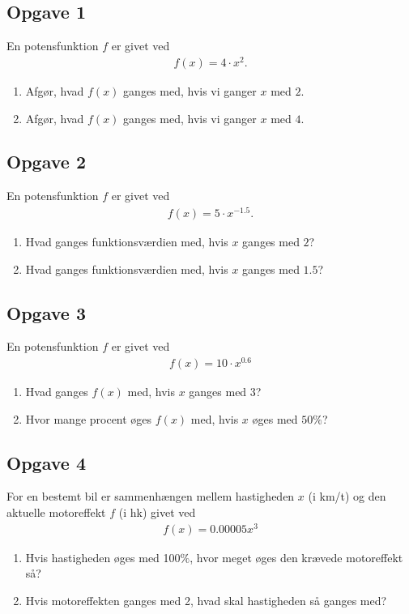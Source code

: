 \subsection*{Opgave 1}
En potensfunktion $f$ er givet ved
\begin{align*}
	f(x) = 4\cdot x^2.
\end{align*}
\begin{enumerate}[label=\roman*)]
	\item Afgør, hvad $f(x)$ ganges med, hvis vi ganger $x$ med $2$.
	\item Afgør, hvad $f(x)$ ganges med, hvis vi ganger $x$ med $4$.
\end{enumerate}

\subsection*{Opgave 2}
En potensfunktion $f$ er givet ved
\begin{align*}
	f(x) = 5\cdot x^{-1.5}.
\end{align*}
\begin{enumerate}[label=\roman*)]
	\item Hvad ganges funktionsværdien med, hvis $x$ ganges med $2$?
	\item Hvad ganges funktionsværdien med, hvis $x$ ganges med $1.5$?
\end{enumerate}

\subsection*{Opgave 3}
En potensfunktion $f$ er givet ved
\begin{align*}
	f(x) = 10\cdot x^{0.6}
\end{align*}
\begin{enumerate}[label=\roman*)]
	\item Hvad ganges $f(x)$ med, hvis $x$ ganges med $3$?
	\item Hvor mange procent øges $f(x)$ med, hvis $x$ øges med $50\%$?
\end{enumerate}

\subsection*{Opgave 4}
For en bestemt bil er sammenhængen mellem hastigheden $x$ (i km/t) og den aktuelle motoreffekt $f$ (i hk) givet ved
\begin{align*}
	f(x) = 0.00005x^3
\end{align*}
\begin{enumerate}[label=\roman*)]
	\item Hvis hastigheden øges med 100$\%$, hvor meget øges den krævede motoreffekt så?
	\item Hvis motoreffekten ganges med 2, hvad skal hastigheden så ganges med?
\end{enumerate}


